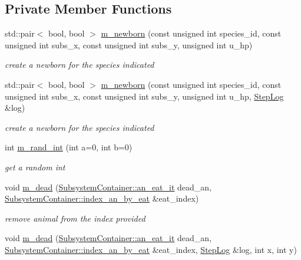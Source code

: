 \subsection*{Private Member Functions}
\begin{DoxyCompactItemize}
\item 
std::pair$<$ bool, bool $>$ \hyperlink{classEcosystemContainer_a1f8ef307d02139dd3483933057478dfd}{m\_\-newborn} (const unsigned int species\_\-id, const unsigned int subs\_\-x, const unsigned int subs\_\-y, unsigned int u\_\-hp)
\begin{DoxyCompactList}\small\item\em create a newborn for the species indicated \end{DoxyCompactList}\item 
std::pair$<$ bool, bool $>$ \hyperlink{classEcosystemContainer_a38c68130f0005de72f8f0ba01bb29472}{m\_\-newborn} (const unsigned int species\_\-id, const unsigned int subs\_\-x, const unsigned int subs\_\-y, unsigned int u\_\-hp, \hyperlink{structStepLog}{StepLog} \&log)
\begin{DoxyCompactList}\small\item\em create a newborn for the species indicated \end{DoxyCompactList}\item 
int \hyperlink{classEcosystemContainer_ad046555c1a42891ea1ceb14fe3a2bed5}{m\_\-rand\_\-int} (int a=0, int b=0)
\begin{DoxyCompactList}\small\item\em get a random int \end{DoxyCompactList}\item 
void \hyperlink{classEcosystemContainer_a8c82bc02305c597ce40914491fbb8aec}{m\_\-dead} (\hyperlink{classSubsystemContainer_a90723cf9f8cdae39e46ff65c5c898c2c}{SubsystemContainer::an\_\-eat\_\-it} dead\_\-an, \hyperlink{classSubsystemContainer_ad6392db27e78a340c21252e63edbe55f}{SubsystemContainer::index\_\-an\_\-by\_\-eat} \&eat\_\-index)
\begin{DoxyCompactList}\small\item\em remove animal from the index provided \end{DoxyCompactList}\item 
void \hyperlink{classEcosystemContainer_a803abe3366ba3d8579a92efc1096a2a6}{m\_\-dead} (\hyperlink{classSubsystemContainer_a90723cf9f8cdae39e46ff65c5c898c2c}{SubsystemContainer::an\_\-eat\_\-it} dead\_\-an, \hyperlink{classSubsystemContainer_ad6392db27e78a340c21252e63edbe55f}{SubsystemContainer::index\_\-an\_\-by\_\-eat} \&eat\_\-index, \hyperlink{structStepLog}{StepLog} \&log, int x, int y)

\end{DoxyCompactItemize}
